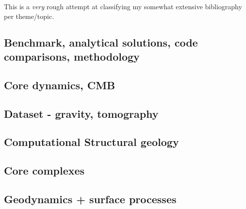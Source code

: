 This is a {\it very} rough attempt at classifying my somewhat extensive 
bibliography per theme/topic.
 


\subsection*{Benchmark, analytical solutions, code comparisons, methodology}

\cite{yusa84}
\cite{zhon96}
\cite{lind99}
\cite{zhmt08}\cite{deka08}
\cite{dumg11}
\cite{lelk15}
\cite{dumy16}

\subsection*{Core dynamics, CMB}

\cite{hayu96}
\cite{lahb08}

\subsection*{Dataset - gravity, tomography}

\cite{dzan81}
\cite{hawj12}

\subsection*{Computational Structural geology}

\cite{acgf00}

\subsection*{Core complexes}

\cite{lehm12}

\subsection*{Geodynamics + surface processes}

\cite{howa94}
\cite{deea98}
\cite{avbu96}
\cite{zemk01}
\cite{lave05}
\cite{alle08}
\cite{vehc13}

